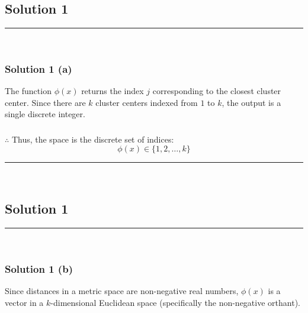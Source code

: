 \documentclass{article}
\begin{document}
\pagestyle{fancy}

\subsection*{Solution 1}
\noindent\rule{\textwidth}{0.4pt}\\
\subsubsection*{Solution 1 (a)}
The function $\phi(x)$ returns the index $j$ corresponding to the closest cluster center. Since there are $k$ cluster centers indexed from $1$ to $k$, the output is a single discrete integer.

\subsubsection*{\normalfont}{$\therefore$ Thus, the space is the discrete set of indices:}
$$ \phi(x) \in \{1, 2, \ldots, k\} $$

\noindent\rule{\textwidth}{0.4pt}\\
\newpage

\subsection*{Solution 1}
\noindent\rule{\textwidth}{0.4pt}\\
\subsubsection*{Solution 1 (b)}
Since distances in a metric space are non-negative real numbers, $\phi(x)$ is a vector in a $k$-dimensional Euclidean space (specifically the non-negative orthant).
\end{document}
